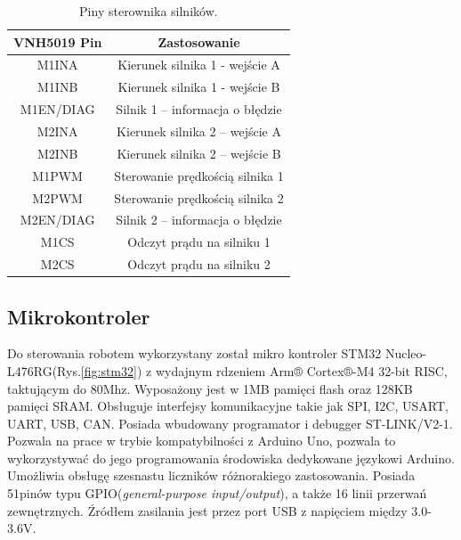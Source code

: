 \begin{table}[!h]
	\centering
	\caption{Piny sterownika silników.}
	\label{pololu_pins}
	\begin{tabular}{|c|c|}
		\hline
		\textbf{VNH5019 Pin} & \textbf{Zastosowanie}           \\ \hline
		M1INA                & Kierunek silnika 1 - wejście A  \\ \hline
		M1INB                & Kierunek silnika 1 - wejście B  \\ \hline
		M1EN/DIAG            & Silnik 1 – informacja o błędzie \\ \hline
		M2INA                & Kierunek silnika 2 – wejście A  \\ \hline
		M2INB                & Kierunek silnika 2 – wejście B  \\ \hline
		M1PWM                & Sterowanie prędkością silnika 1 \\ \hline
		M2PWM                & Sterowanie prędkością silnika 2 \\ \hline
		M2EN/DIAG            & Silnik 2 – informacja o błędzie \\ \hline
		M1CS                 & Odczyt prądu na silniku 1       \\ \hline
		M2CS                 & Odczyt prądu na silniku 2       \\ \hline
	\end{tabular}
\end{table}




\subsection{Mikrokontroler}


Do sterowania robotem wykorzystany został mikro kontroler  STM32 Nucleo-L476RG(Rys.\ref{fig:stm32}) z wydajnym rdzeniem Arm® Cortex®-M4 32-bit RISC, taktującym do 80Mhz. Wyposażony jest w 1MB pamięci flash oraz 128KB pamięci SRAM. Obsługuje interfejsy komunikacyjne takie jak SPI, I2C, USART, UART, USB, CAN. Posiada wbudowany programator i debugger ST-LINK/V2-1. Pozwala na prace w trybie kompatybilności z Arduino Uno, pozwala to wykorzystywać do jego programowania środowiska dedykowane językowi Arduino. Umożliwia obsługę szesnastu liczników różnorakiego zastosowania. Posiada 51pinów typu GPIO(\textit{general-purpose input/output}), a także 16 linii przerwań zewnętrznych. Źródłem zasilania jest przez port USB z napięciem między 3.0-3.6V.

